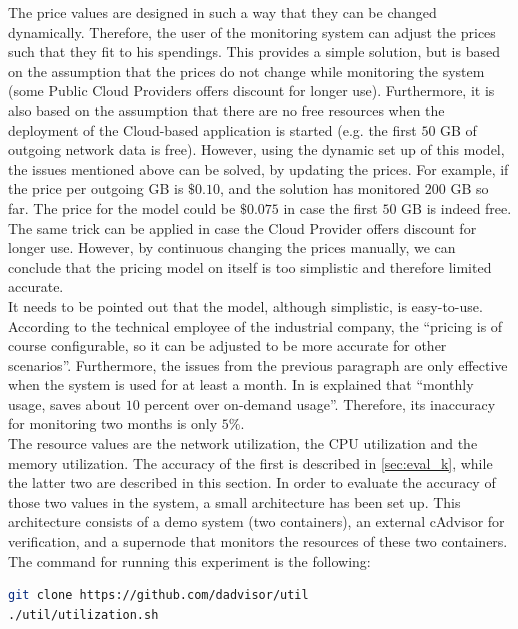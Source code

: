 \noindent
The price values are designed in such a way that they can be changed dynamically. Therefore, the user of the monitoring system can adjust the prices such that they fit to his spendings. This provides a simple solution, but is based on the assumption that the prices do not change while monitoring the system (some Public Cloud Providers offers discount for longer use). Furthermore, it is also based on the assumption that there are no free resources when the deployment of the Cloud-based application is started (e.g. the first $50$ GB of outgoing network data is free). However, using the dynamic set up of this model, the issues mentioned above can be solved, by updating the prices. For example, if the price per outgoing GB is $\$0.10$, and the solution has monitored $200$ GB so far. The price for the model could be $\$0.075$ in case the first $50$ GB is indeed free. The same trick can be applied in case the Cloud Provider offers discount for longer use. However, by continuous changing the prices manually, we can conclude that the pricing model on itself is too simplistic and therefore limited accurate.\\

\noindent
It needs to be pointed out that the model, although simplistic, is easy-to-use. According to the technical employee of the industrial company, the ``pricing is of course configurable, so it can be adjusted to be more accurate for other scenarios''. Furthermore, the issues from the previous paragraph are only effective when the system is used for at least a month. In \cite{infoworld} is explained that ``monthly usage, saves about $10$ percent over on-demand usage''. Therefore, its inaccuracy for monitoring two months is only $5\%$.\\

\noindent
The resource values are the network utilization, the CPU utilization and the memory utilization. The accuracy of the first is described in \autoref{sec:eval_k}, while the latter two are described in this section. In order to evaluate the accuracy of those two values in the system, a small architecture has been set up. This architecture consists of a demo system (two containers), an external cAdvisor for verification, and a supernode that monitors the resources of these two containers. The command for running this experiment is the following:

\begin{lstlisting}[language=bash, caption=Docker-compose]
git clone https://github.com/dadvisor/util
./util/utilization.sh
\end{lstlisting}


